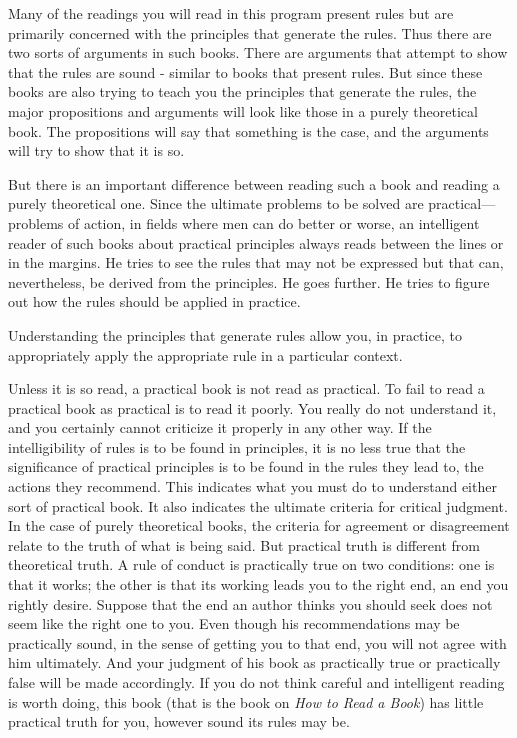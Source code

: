 Many of the readings you will read in this program present rules but are primarily concerned with the principles that generate the rules. Thus there are two sorts of arguments in such books. There are arguments that attempt to show that the rules are sound - similar to books that present rules. But since these books are also trying to teach you the principles that generate the rules, the major propositions and arguments will look like those in a purely theoretical book. The propositions will say that something is the case, and the arguments will try to show that it is so.
\begin{displayquote}
But there is an important difference between reading such a book and reading a purely theoretical one. Since the ultimate problems to be solved are practical—problems of action, in fields where men can do better or worse, an intelligent reader of such books about practical principles always reads between the lines or in the margins. He tries to see the rules that may not be expressed but that can, nevertheless, be derived from the principles. He goes further. He tries to figure out how the rules should be applied in practice.
\end{displayquote}

Understanding the principles that generate rules allow you, in practice, to appropriately apply the appropriate rule in a particular context. 
\begin{displayquote}
Unless it is so read, a practical book is not read as practical. To fail to read a practical book as practical is to read it poorly. You really do not understand it, and you certainly cannot criticize it properly in any other way. If the intelligibility of rules is to be found in principles, it is no less true that the significance of practical principles is to be found in the rules they lead to, the actions they recommend. This indicates what you must do to understand either sort of practical book. It also indicates the ultimate criteria for critical judgment. In the case of purely theoretical books, the criteria for agreement or disagreement relate to the truth of what is being said. But practical truth is different from theoretical truth. A rule of conduct is practically true on two conditions: one is that it works; the other is that its working leads you to the right end, an end you rightly desire. Suppose that the end an author thinks you should seek does not seem like the right one to you. Even though his recommendations may be practically sound, in the sense of getting you to that end, you will not agree with him ultimately. And your judgment of his book as practically true or practically false will be made accordingly. If you do not think careful and intelligent reading is worth doing, this book (that is the book on \textit{How to Read a Book}) has little practical truth for you, however sound its rules may be.
\end{displayquote}


\printbibliography[heading=subbibintoc]



